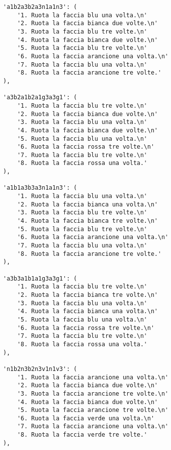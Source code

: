 \begin{lstlisting}
        'a1b2a3b2a3n1a1n3': (
            '1. Ruota la faccia blu una volta.\n'
            '2. Ruota la faccia bianca due volte.\n'
            '3. Ruota la faccia blu tre volte.\n'
            '4. Ruota la faccia bianca due volte.\n'
            '5. Ruota la faccia blu tre volte.\n'
            '6. Ruota la faccia arancione una volta.\n'
            '7. Ruota la faccia blu una volta.\n'
            '8. Ruota la faccia arancione tre volte.'
        ),
        
        'a3b2a1b2a1g3a3g1': (
            '1. Ruota la faccia blu tre volte.\n'
            '2. Ruota la faccia bianca due volte.\n'
            '3. Ruota la faccia blu una volta.\n'
            '4. Ruota la faccia bianca due volte.\n'
            '5. Ruota la faccia blu una volta.\n'
            '6. Ruota la faccia rossa tre volte.\n'
            '7. Ruota la faccia blu tre volte.\n'
            '8. Ruota la faccia rossa una volta.'
        ),
        
        'a1b1a3b3a3n1a1n3': (
            '1. Ruota la faccia blu una volta.\n'
            '2. Ruota la faccia bianca una volta.\n'
            '3. Ruota la faccia blu tre volte.\n'
            '4. Ruota la faccia bianca tre volte.\n'
            '5. Ruota la faccia blu tre volte.\n'
            '6. Ruota la faccia arancione una volta.\n'
            '7. Ruota la faccia blu una volta.\n'
            '8. Ruota la faccia arancione tre volte.'
        ),
        
        'a3b3a1b1a1g3a3g1': (
            '1. Ruota la faccia blu tre volte.\n'
            '2. Ruota la faccia bianca tre volte.\n'
            '3. Ruota la faccia blu una volta.\n'
            '4. Ruota la faccia bianca una volta.\n'
            '5. Ruota la faccia blu una volta.\n'
            '6. Ruota la faccia rossa tre volte.\n'
            '7. Ruota la faccia blu tre volte.\n'
            '8. Ruota la faccia rossa una volta.'
        ),
        
        'n1b2n3b2n3v1n1v3': (
            '1. Ruota la faccia arancione una volta.\n'
            '2. Ruota la faccia bianca due volte.\n'
            '3. Ruota la faccia arancione tre volte.\n'
            '4. Ruota la faccia bianca due volte.\n'
            '5. Ruota la faccia arancione tre volte.\n'
            '6. Ruota la faccia verde una volta.\n'
            '7. Ruota la faccia arancione una volta.\n'
            '8. Ruota la faccia verde tre volte.'
        ),
        

\end{lstlisting}
